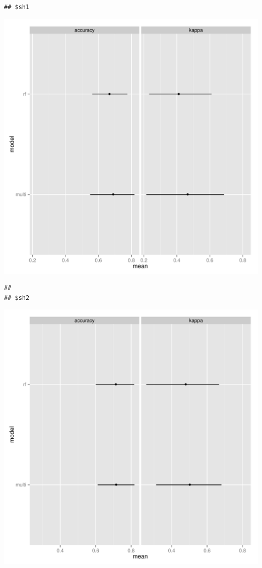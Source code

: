\documentclass{article}\usepackage{graphicx, color}
\makeatletter
\def\maxwidth{ %
  \ifdim\Gin@nat@width>\linewidth
    \linewidth
  \else
    \Gin@nat@width
  \fi
}
\newenvironment{kframe}{%
 \def\at@end@of@kframe{}%
 \ifinner\ifhmode%
  \def\at@end@of@kframe{\end{minipage}}%
  \begin{minipage}{\columnwidth}%
 \fi\fi%
 \def\FrameCommand##1{\hskip\@totalleftmargin \hskip-\fboxsep
 \colorbox{shadecolor}{##1}\hskip-\fboxsep
     \hskip-\linewidth \hskip-\@totalleftmargin \hskip\columnwidth}%
 \MakeFramed {\advance\hsize-\width
   \@totalleftmargin\z@ \linewidth\hsize
   \@setminipage}}%
 {\par\unskip\endMakeFramed%
 \at@end@of@kframe}
\newenvironment{knitrout}{}{} %
\makeatother
\begin{document}
\begin{knitrout}
\color{fgcolor}\begin{kframe}
\begin{verbatim}
## $sh1
\end{verbatim}
\end{kframe}
\includegraphics[width=\maxwidth]{figure/resamp1} 
\begin{kframe}\begin{verbatim}
## 
## $sh2
\end{verbatim}
\end{kframe}
\includegraphics[width=\maxwidth]{figure/resamp2} 

\end{knitrout}
\end{document}
